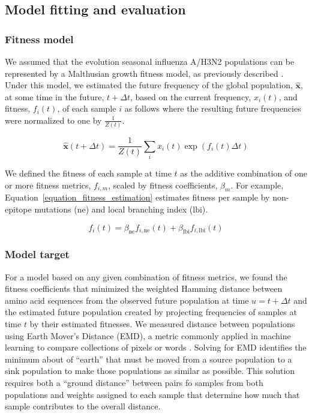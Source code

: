 \subsection*{Model fitting and evaluation}

\subsubsection*{Fitness model}

We assumed that the evolution seasonal influenza A/H3N2 populations can be represented by a Malthusian growth fitness model, as previously described \cite{Luksza:2014hj}.
Under this model, we estimated the future frequency of the global population, $\mathbf{\hat{x}}$, at some time in the future, $t + \Delta{t}$, based on the current frequency, $x_{i}(t)$, and fitness, $f_{i}(t)$, of each sample $i$ as follows where the resulting future frequencies were normalized to one by $\frac{1}{Z(t)}$.

\begin{equation}
    \mathbf{\hat{x}}(t + \Delta{t}) = \frac{1}{Z(t)}\sum_{i}x_{i}(t)\exp(f_{i}(t)\Delta{t})
    \label{equation_exponential_growth_model}
\end{equation}

We defined the fitness of each sample at time $t$ as the additive combination of one or more fitness metrics, $f_{i,m}$, scaled by fitness coefficients, $\beta_{m}$.
For example, Equation~\ref{equation_fitness_estimation} estimates fitness per sample by non-epitope mutations ($\mathrm{ne}$) and local branching index ($\mathrm{lbi}$).

\begin{equation}
    f_{i}(t) = \beta_{\mathrm{ne}}f_{i, \mathrm{ne}}(t) + \beta_{\mathrm{lbi}}f_{i, \mathrm{lbi}}(t)
    \label{equation_fitness_estimation}
\end{equation}

\subsubsection*{Model target}

For a model based on any given combination of fitness metrics, we found the fitness coefficients that minimized the weighted Hamming distance between amino acid sequences from the observed future population at time $u = t + \Delta{t}$ and the estimated future population created by projecting frequencies of samples at time $t$ by their estimated fitnesses.
We measured distance between populations using Earth Mover's Distance (EMD), a metric commonly applied in machine learning to compare collections of pixels or words \cite{Rubner1998,Kusner2015}.
Solving for EMD identifies the minimum about of ``earth'' that must be moved from a source population to a sink population to make those populations as similar as possible.
This solution requires both a ``ground distance'' between pairs fo samples from both populations and weights assigned to each sample that determine how much that sample contributes to the overall distance.

